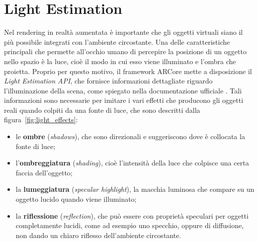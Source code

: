 \documentclass[crop=false, class=book]{standalone}
\begin{document}
	\section{Light Estimation}
	\label{sec:light_est}
	Nel rendering in realtà aumentata è importante che gli oggetti virtuali siano il più possibile integrati con l'ambiente circostante. Una delle caratteristiche principali che permette all'occhio umano di percepire la posizione di un oggetto nello spazio è la luce, cioè il modo in cui esso viene illuminato e l'ombra che proietta. 
	Proprio per questo motivo, il framework ARCore mette a disposizione il \textit{Light Estimation API}, che fornisce informazioni dettagliate riguardo l'illuminazione della scena, come spiegato nella documentazione ufficiale \cite{google2022light}.
	Tali informazioni sono necessarie per imitare i vari effetti che producono gli oggetti reali quando colpiti da una fonte di luce, che sono descritti dalla figura~\vref{fig:light_effects}:
	\begin{itemize}
		\item le \textbf{ombre} (\textit{shadows}), che sono direzionali e suggeriscono dove è collocata la fonte di luce;
		\item l'\textbf{ombreggiatura} (\textit{shading}), cioè l'intensità della luce che colpisce una certa faccia dell'oggetto;
		\item la \textbf{lumeggiatura} (\textit{specular highlight}), la macchia luminosa che compare su un oggetto lucido quando viene illuminato;
		\item la \textbf{riflessione} (\textit{reflection}), che può essere con proprietà speculari per oggetti completamente lucidi, come ad esempio uno specchio, oppure di diffusione, non dando un chiaro riflesso dell'ambiente circostante. 
	\end{itemize}
	
\end{document}
